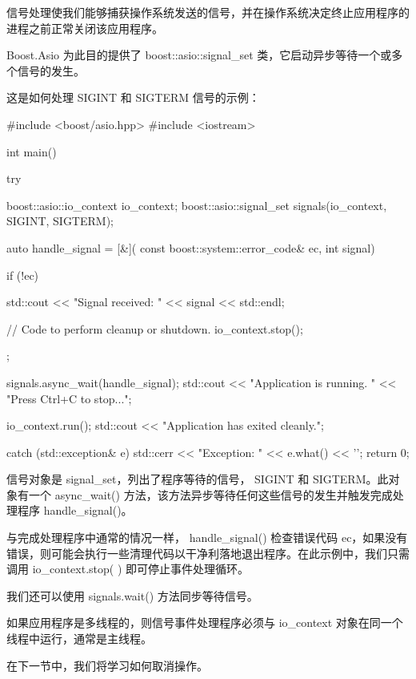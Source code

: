信号处理使我们能够捕获操作系统发送的信号，并在操作系统决定终止应用程序的进程之前正常关闭该应用程序。

Boost.Asio 为此目的提供了 boost::asio::signal\_set 类，它启动异步等待一个或多个信号的发生。

这是如何处理 SIGINT 和 SIGTERM 信号的示例：

\begin{cpp}
#include <boost/asio.hpp>
#include <iostream>

int main() {
    try {
        boost::asio::io_context io_context;
        boost::asio::signal_set signals(io_context,
                                SIGINT, SIGTERM);

        auto handle_signal = [&](
                const boost::system::error_code& ec,
                int signal) {
            if (!ec) {
                std::cout << "Signal received: "
                          << signal << std::endl;

                // Code to perform cleanup or shutdown.
                io_context.stop();
            }
        };

        signals.async_wait(handle_signal);
        std::cout << "Application is running. "
                  << "Press Ctrl+C to stop...\n";

        io_context.run();
        std::cout << "Application has exited cleanly.\n";
    } catch (std::exception& e) {
        std::cerr << "Exception: " << e.what() << '\n';
    }
    return 0;
}
\end{cpp}

信号对象是 signal\_set，列出了程序等待的信号， SIGINT 和 SIGTERM。此对象有一个 async\_wait() 方法，该方法异步等待任何这些信号的发生并触发完成处理程序 handle\_signal()。

与完成处理程序中通常的情况一样， handle\_signal() 检查错误代码 ec，如果没有错误，则可能会执行一些清理代码以干净利落地退出程序。在此示例中，我们只需调用 io\_context.stop( ) 即可停止事件处理循环。

我们还可以使用 signals.wait() 方法同步等待信号。

如果应用程序是多线程的，则信号事件处理程序必须与 io\_context 对象在同一个线程中运行，通常是主线程。

在下一节中，我们将学习如何取消操作。









